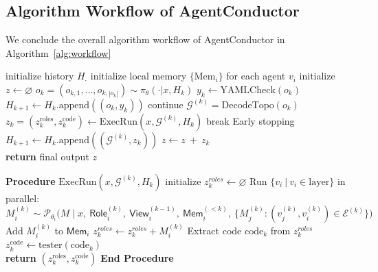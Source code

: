 \documentclass{article}
\theoremstyle{definition}
\newcommand{\errbox}[2]{\kwtagi[#1]{\texttt{\textcolor{#1}{#2}}}}
\newcommand{\PASSED}{\errbox{passColor}{PASSED}}
\begin{document}
\subsection{Algorithm Workflow of AgentConductor}\label{appendix:alg}
We conclude the overall algorithm workflow of AgentConductor in Algorithm~\ref{alg:workflow}
\begin{algorithm}[t]
    \caption{Online Topology Generation Workflow of AgentConductor}
    \label{alg:workflow}
    \begin{algorithmic}[1] 
            \STATE initialize history $H_{\cdot}$
            \STATE initialize local memory $\{ \mathrm{Mem}_i \}$ for each agent $v_i$
            \STATE initialize $z \leftarrow \varnothing$
                \STATE $o_k=(o_{k,1},\ldots,o_{k,|o_k|}) \sim \pi_\theta(\cdot|x,H_k)$
                    \STATE $y_k \leftarrow \mathrm{YAMLCheck}(o_k)$
                    \STATE $H_{k+1}\leftarrow H_{k}.\text{append}((o_k,y_k))$
                    \STATE continue
                \ENDIF
                \STATE $\mathcal{G}^{(k)} = \mathrm{DecodeTopo}(o_k)$
                \STATE $z_k = (z_k^{\text{roles}},z_k^{\text{code}}) \leftarrow \mathrm{ExecRun}(x,\mathcal{G}^{(k)},H_k)$
                \IF{\PASSED \ in $z^{\text{code}}_k$}
                    \STATE break \COMMENT Early stopping
                \ENDIF
                \STATE $H_{k+1}\leftarrow H_{k}.\text{append}((\mathcal{G}^{(k)},z_k))$
                \STATE $z \leftarrow z \  + \  z_k$
            \ENDFOR \\
            \STATE \textbf{return} final output $z$
            
        \STATE \textbf{Procedure} $\mathrm{ExecRun}(x,\mathcal{G}^{(k)},H_k)$
            \STATE initialize $z_k^{roles} \leftarrow \varnothing$
                \STATE Run $\{ v_i\ |\ v_i \in \mathrm{layer} \}$ in parallel:
                \STATE \quad $M_i^{(k)} \sim \mathcal{P}_{\theta_i}\!\big(M \mid x,\ \textsf{Role}_i^{(k)},\ \textsf{View}_i^{(k-1)},\ \textsf{Mem}_i^{(<k)},\ \{M_j^{(k)}:(v_j^{(k)},v_i^{(k)})\in\mathcal{E}^{(k)}\}\big)$
                \STATE \quad Add $M_i^{(k)}$ to $\textsf{Mem}_i$
                \STATE \quad $z_k^{roles} \leftarrow z_k^{roles}+M_i^{(k)}$
            \ENDFOR
            \STATE Extract code $\mathrm{code}_k$ from $z_k^{roles}$
            \STATE $z_k^{\mathrm{code}} \leftarrow \mathrm{tester}(\mathrm{code}_k)$ \\
            \STATE \textbf{return} $(z_k^{\mathrm{roles}}, z_k^{\mathrm{code}})$
        \STATE \textbf{End Procedure}
    \end{algorithmic}
\end{algorithm}
\end{document}

